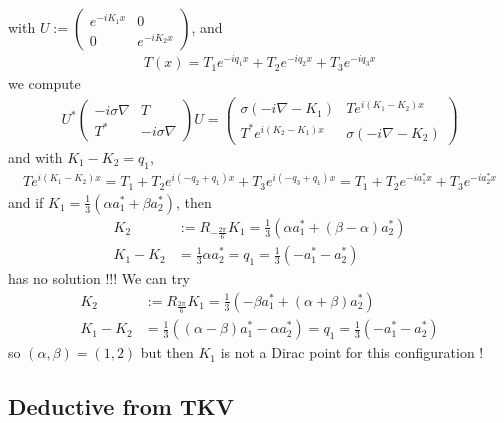 \documentclass[11pt,a4paper,reqno,french,tikz]{amsart}
\newcommand{\pa}[1]{\left( #1 \right)} %
\newcommand{\na}{\nabla} %
\newcommand{\f}[2]{\frac{#1}{#2}} %
\newcommand{\mat}[1]{\begin{pmatrix} #1 \end{pmatrix}} %
\begin{document}
with $U := \mat{e^{-iK_1 x} & 0 \\ 0 & e^{-iK_2 x}}$, and
\begin{align*}
T(x) = T_1 e^{-iq_1 x}  +T_2 e^{-iq_2 x}  +T_3 e^{-iq_3 x} 
\end{align*}
we compute
\begin{align}\label{eq:UmatU}
	U^* \mat{-i\sigma \na & T \\ T^* & -i\sigma \na} U = \mat{\sigma\pa{-i\na - K_1} & T e^{i\pa{K_1 - K_2}x} \\ T^* e^{i\pa{K_2-K_1}x} & \sigma\pa{-i\na - K_2}} 
\end{align}
and with $K_1 - K_2 = q_1$,
\begin{align*}
T e^{i\pa{K_1 - K_2}x} = T_1 + T_2 e^{i\pa{-q_2+q_1}x} + T_3 e^{i\pa{-q_3+q_1}x} = T_1 + T_2 e^{-i a_1^* x} + T_3 e^{-ia_2^* x}
\end{align*}
 and if $K_1 = \f 13 \pa{\alpha a_1^* + \beta a_2^*}$, then 
\begin{align*}
	K_2 &:= R_{-\f{2\pi}{6}} K_1 = \f 13 \pa{\alpha a_1^* + \pa{\beta-\alpha}a_2^*} \\
K_1 - K_2 &= \f 13 \alpha a_2^* = q_1 = \f 13 \pa{-a_1^* - a_2 ^*}
\end{align*}
has no solution !!! We can try
\begin{align*}
	K_2 &:= R_{\f{2\pi}{6}} K_1 = \f 13 \pa{-\beta a_1^* + \pa{\alpha + \beta}a_2^*} \\
K_1 - K_2 &= \f 13 \pa{\pa{\alpha -\beta}a_1^* - \alpha a_2^*} = q_1 = \f 13 \pa{-a_1^* - a_2 ^*}
\end{align*}
so $(\alpha,\beta) = (1,2)$ but then $K_1$ is not a Dirac point for this configuration !

\subsection{Deductive from TKV}%
\label{sub:deductive_from_tkv}
\end{document}
